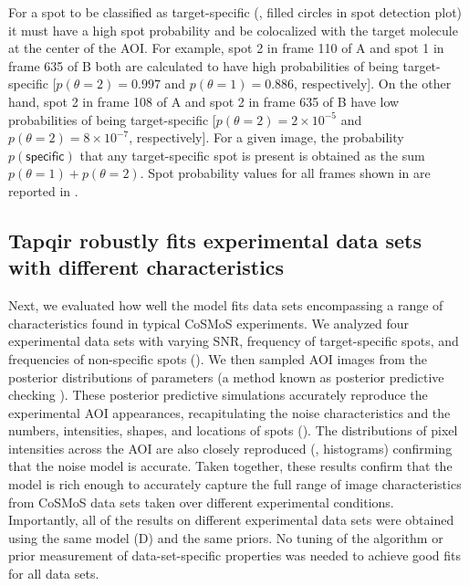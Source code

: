 For a spot to be classified as target-specific (, filled circles in spot detection plot) it must have a high spot probability and be colocalized with the target molecule at the center of the AOI. For example, spot 2 in frame 110 of A and spot 1 in frame 635 of B both are calculated to have high probabilities of being target-specific [$p(\theta=2) = 0.997$ and $p(\theta=1) = 0.886$, respectively]. On the other hand, spot 2 in frame 108 of A and spot 2 in frame 635 of B have low probabilities of being target-specific [$p(\theta=2) = 2 \times 10^{-5}$ and $p(\theta=2) = 8 \times 10^{-7}$, respectively]. For a given image, the probability $p(\mathsf{specific})$ that any target-specific spot is present is obtained as the sum $p(\theta=1) + p(\theta=2)$. Spot probability values for all frames shown in  are reported in .  

\subsection{Tapqir robustly fits experimental data sets with different characteristics}

Next, we evaluated how well the model fits data sets encompassing a range of characteristics found in typical CoSMoS experiments. We analyzed four experimental data sets with varying SNR, frequency of target-specific spots, and frequencies of non-specific spots (). We then sampled AOI images from the posterior distributions of parameters (a method known as posterior predictive checking \citep{Gelman2013-ro}). These posterior predictive simulations accurately reproduce the experimental AOI appearances, recapitulating the noise characteristics and the numbers, intensities, shapes, and locations of spots ().  The distributions of pixel intensities across the AOI are also closely reproduced (, histograms) confirming that the noise model is accurate. Taken together, these results confirm that the model is rich enough to accurately capture the full range of image characteristics from CoSMoS data sets taken over different experimental conditions.  Importantly, all of the results on different experimental data sets were obtained using the same model (D) and the same priors.  No tuning of the algorithm or prior measurement of data-set-specific properties was needed to achieve good fits for all data sets.

